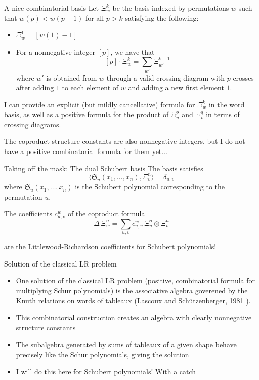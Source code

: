 \documentclass[aspectratio=169]{beamer}
\newcommand{\Sch}[1]{\Xi_{#1}}
\begin{document}
\begin{frame}{A nice combinatorial basis}
Let $\Xi_w^k$ be the basis indexed by permutations $w$ such that $w(p) < w(p+1)$ for all $p>k$ satisfying the following:
\begin{itemize}
\item $\Xi_{w}^1 = [w(1) - 1]$
\item For a nonnegative integer $[p]$, we have that
$$[p]\cdot\Xi_w^k = \sum_{w'}\Xi_{w'}^{k+1}$$
where $w'$ is obtained from $w$ through a valid crossing diagram with $p$ crosses after adding $1$ to each element of $w$ and adding a new first element $1$. 
\end{itemize}

I can provide an explicit (but mildly cancellative) formula for $\Xi_w^k$ in the word basis, as well as a positive formula for the product of $\Xi_u^p$ and $\Xi_v^q$ in terms of crossing diagrams. 

The coproduct structure constants are also nonnegative integers, but I do not have a positive combinatorial formula for them yet$\ldots$
\end{frame}

\begin{frame}{Taking off the mask: The dual Schubert basis}
The basis satisfies
$$\langle \mathfrak{S}_{u}(x_1,\ldots,x_n), \Xi_{v}^{n} \rangle = \delta_{u,v}$$
where $\mathfrak{S}_{u}(x_1,\ldots,x_n)$ is the Schubert polynomial corresponding to the permutation $u$.

The coefficients $c_{u,v}^{w}$ of the coproduct formula
\[
\Delta\,\Sch{w}^{n} = \sum_{u,v} c_{u,v}^{w}\,\Sch{u}^{n}\otimes \Sch{v}^{n}
\]

are the Littlewood-Richardson coefficients for Schubert polynomials!

\end{frame}

\begin{frame}{Solution of the classical LR problem}
  \begin{itemize}
  \item One solution of the classical LR problem (positive, combinatorial formula for multiplying Schur polynomials) is the associative algebra goverened by the Knuth relations on words of tableaux (Lascoux and Sch\"utzenberger, 1981 \cite{lascoux1981monoide}).
  \item This combinatorial construction creates an algebra with clearly nonnegative structure constants
  \item The subalgebra generated by sums of tableaux of a given shape behave precisely like the Schur polynomials, giving the solution

  \item I will do this here for Schubert polynomials! With a catch
  \end{itemize}
\end{frame}
\end{document}
